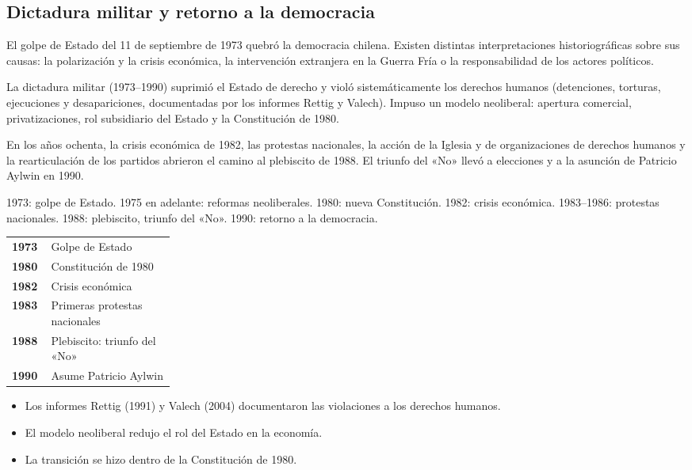 \documentclass[10pt,a4paper,twocolumn]{article}
\makeatletter
\renewcommand{\arraystretch}{1.18}
\newenvironment{lineatiempo}[1][Línea de tiempo]
  {\begin{tcolorbox}[paes, acento=zinc700, title={#1}]\small\renewcommand{\arraystretch}{1.25}%
   \begin{tabular}{@{}>{\leavevmode\sffamily\bfseries\color{zinc700}}p{0.24\linewidth}p{\dimexpr0.76\linewidth-2\tabcolsep\relax}@{}}}
  {\end{tabular}\end{tcolorbox}}
\makeatother
\begin{document}
\subsection{Dictadura militar y retorno a la democracia}

El golpe de Estado del 11 de septiembre de 1973 quebró la democracia chilena. Existen distintas interpretaciones historiográficas sobre sus causas: la polarización y la crisis económica, la intervención extranjera en la Guerra Fría o la responsabilidad de los actores políticos.

La dictadura militar (1973–1990) suprimió el Estado de derecho y violó sistemáticamente los derechos humanos (detenciones, torturas, ejecuciones y desapariciones, documentadas por los informes Rettig y Valech). Impuso un modelo neoliberal: apertura comercial, privatizaciones, rol subsidiario del Estado y la Constitución de 1980.

En los años ochenta, la crisis económica de 1982, las protestas nacionales, la acción de la Iglesia y de organizaciones de derechos humanos y la rearticulación de los partidos abrieron el camino al plebiscito de 1988. El triunfo del «No» llevó a elecciones y a la asunción de Patricio Aylwin en 1990.

\begin{definicion}[Etapas]
1973: golpe de Estado. 1975 en adelante: reformas neoliberales. 1980: nueva Constitución. 1982: crisis económica. 1983–1986: protestas nacionales. 1988: plebiscito, triunfo del «No». 1990: retorno a la democracia.
\end{definicion}

\begin{lineatiempo}
1973 & Golpe de Estado \\
1980 & Constitución de 1980 \\
1982 & Crisis económica \\
1983 & Primeras protestas nacionales \\
1988 & Plebiscito: triunfo del «No» \\
1990 & Asume Patricio Aylwin \\
\end{lineatiempo}

\begin{ideasclave}
\begin{itemize}
  \item Los informes Rettig (1991) y Valech (2004) documentaron las violaciones a los derechos humanos.
  \item El modelo neoliberal redujo el rol del Estado en la economía.
  \item La transición se hizo dentro de la Constitución de 1980.
\end{itemize}
\end{ideasclave}
\end{document}
